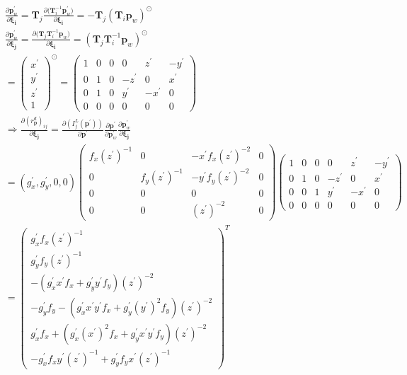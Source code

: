 \documentclass{article}
\begin{document}
\begin{CJK*}{GBK}{song}
\begin{equation}\left.\begin{aligned}
&
\frac{\partial{\textbf{p}^{'}_{w}}}{\partial{\boldsymbol{\xi_{i}}}}=\textbf{T}_j
\frac{\partial{(\textbf{T}_i^{-1}\textbf{p}^{'}_{w}})}{\partial{\boldsymbol{\xi_{i}}}}
=-\textbf{T}_j(\textbf{T}_i\textbf{p}_w)^{\odot}
\\&
\frac{\partial{\textbf{p}^{'}_{w}}}{\partial{\boldsymbol{\xi_{j}}}}=
\frac{\partial{(\textbf{T}_j\textbf{T}_i^{-1}\textbf{p}_{w}})}{\partial{\boldsymbol{\xi_{i}}}}
=(\textbf{T}_j\textbf{T}_i^{-1}\textbf{p}_w)^{\odot}
\\&
=\begin{pmatrix}
x^{'}\\y^{'}\\z^{'}\\1
\end{pmatrix}^{\odot}
=\begin{pmatrix}
  1&0&0&     0&z^{'} &-y^{'}
\\0&1&0&-z^{'}&0     &x^{'}
\\0&1&0& y^{'}&-x^{'}&0
\\0&0&0&0&0&0
\end{pmatrix}
\\&
\Rightarrow
\frac{\partial{(r^{d}_{\textbf{p}})_{ij}}}{\partial{\boldsymbol{\xi_{j}}}}=
\frac{\partial{(I^L_j(\textbf{p}^{'}))}}{\partial{\textbf{p}^{'}}}
\frac{\partial{\textbf{p}^{'}}}{\partial{\textbf{p}^{'}_{w}}}
\frac{\partial{\textbf{p}^{'}_{w}}}{\partial{\boldsymbol{\xi_{j}}}}
\\&
=(g_x^{'},g_y^{'},0,0)
\begin{pmatrix}
f_x(z^{'})^{-1}&0&-x^{'}f_x(z^{'})^{-2}&0
\\0&f_y(z^{'})^{-1}&-y^{'}f_y(z^{'})^{-2}&0
\\0&0&0&0
\\0&0&(z^{'})^{-2}&0
\end{pmatrix}
\begin{pmatrix}
  1&0&0&     0&z^{'} &-y^{'}
\\0&1&0&-z^{'}&0     &x^{'}
\\0&0&1& y^{'}&-x^{'}&0
\\0&0&0&0&0&0
\end{pmatrix}
\\&
=\begin{pmatrix}
 g_x^{'}f_x(z^{'})^{-1}
\\g_y^{'}f_y(z^{'})^{-1}
\\-(g_x^{'}x^{'}f_x + g_y^{'}y^{'}f_y)(z^{'})^{-2}
\\-g_y^{'}f_y-(g_x^{'}x^{'}y^{'}f_x+g_y^{'}(y^{'})^{2}f_y)(z^{'})^{-2}
\\g_x^{'}f_x +(g_x^{'}(x^{'})^{2}f_x+g_y^{'}x^{'}y^{'}f_y)(z^{'})^{-2}
\\-g_x^{'}f_xy^{'}(z^{'})^{-1}+g_y^{'}f_yx^{'}(z^{'})^{-1}
\end{pmatrix}^{T}
\end{aligned}\tag{2.2}\right.\end{equation}

\end{CJK*}
\end{document}
